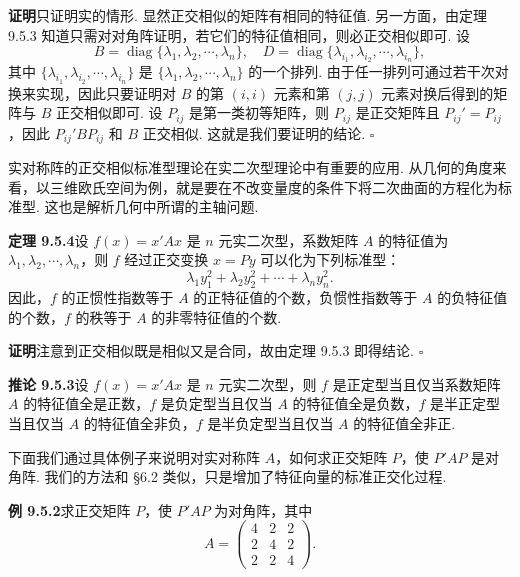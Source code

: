 \documentclass[UTF8,12pt,a4paper,fontset=fandol]{ctexart}
\begin{document}
\noindent\textbf{证明}\quad 只证明实的情形. 显然正交相似的矩阵有相同的特征值. 另一方面，由定理 9.5.3 知道只需对对角阵证明，若它们的特征值相同，则必正交相似即可. 设
\[
  B=\operatorname{diag}\{\lambda_1,\lambda_2,\cdots,\lambda_n\},\quad
  D=\operatorname{diag}\{\lambda_{i_1},\lambda_{i_2},\cdots,\lambda_{i_n}\},
\]
其中 $\{\lambda_{i_1},\lambda_{i_2},\cdots,\lambda_{i_n}\}$ 是 $\{\lambda_1,\lambda_2,\cdots,\lambda_n\}$ 的一个排列. 由于任一排列可通过若干次对换来实现，因此只要证明对 $B$ 的第 $(i,i)$ 元素和第 $(j,j)$ 元素对换后得到的矩阵与 $B$ 正交相似即可. 设 $P_{ij}$ 是第一类初等矩阵，则 $P_{ij}$ 是正交矩阵且 $P_{ij}'=P_{ij}$，因此 $P_{ij}'BP_{ij}$ 和 $B$ 正交相似. 这就是我们要证明的结论. $\square$

实对称阵的正交相似标准型理论在实二次型理论中有重要的应用. 从几何的角度来看，以三维欧氏空间为例，就是要在不改变量度的条件下将二次曲面的方程化为标准型. 这也是解析几何中所谓的主轴问题.

\noindent\textbf{定理 9.5.4}\quad 设 $f(x)=x'Ax$ 是 $n$ 元实二次型，系数矩阵 $A$ 的特征值为 $\lambda_1,\lambda_2,\cdots,\lambda_n$，则 $f$ 经过正交变换 $x=Py$ 可以化为下列标准型：
\[
  \lambda_1y_1^2+\lambda_2y_2^2+\cdots+\lambda_ny_n^2.
\]
因此，$f$ 的正惯性指数等于 $A$ 的正特征值的个数，负惯性指数等于 $A$ 的负特征值的个数，$f$ 的秩等于 $A$ 的非零特征值的个数.

\noindent\textbf{证明}\quad 注意到正交相似既是相似又是合同，故由定理 9.5.3 即得结论. $\square$

\noindent\textbf{推论 9.5.3}\quad 设 $f(x)=x'Ax$ 是 $n$ 元实二次型，则 $f$ 是正定型当且仅当系数矩阵 $A$ 的特征值全是正数，$f$ 是负定型当且仅当 $A$ 的特征值全是负数，$f$ 是半正定型当且仅当 $A$ 的特征值全非负，$f$ 是半负定型当且仅当 $A$ 的特征值全非正.

下面我们通过具体例子来说明对实对称阵 $A$，如何求正交矩阵 $P$，使 $P'AP$ 是对角阵. 我们的方法和 §6.2 类似，只是增加了特征向量的标准正交化过程.

\noindent\textbf{例 9.5.2}\quad 求正交矩阵 $P$，使 $P'AP$ 为对角阵，其中
\[
  A=
  \left(\begin{array}{ccc}
    4 & 2 & 2\\
    2 & 4 & 2\\
    2 & 2 & 4
  \end{array}\right).
\]
\end{document}
